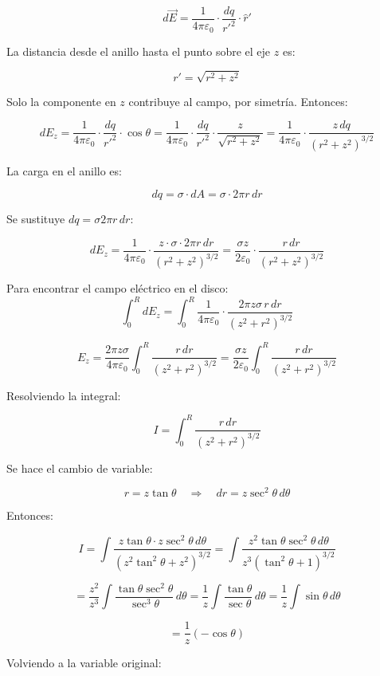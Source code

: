 \documentclass[12pt]{article}
\begin{document}
\[
d\vec{E} = \frac{1}{4\pi \varepsilon_0} \cdot \frac{dq}{r'^2} \cdot \hat{r}'
\]

La distancia desde el anillo hasta el punto sobre el eje \( z \) es:

\[
r' = \sqrt{r^2 + z^2}
\]

Solo la componente en \( z \) contribuye al campo, por simetría. Entonces:

\[
dE_z = \frac{1}{4\pi \varepsilon_0} \cdot \frac{dq}{r'^2} \cdot \cos\theta = \frac{1}{4\pi \varepsilon_0} \cdot \frac{dq}{r'^2} \cdot \frac{z}{\sqrt{r^2 + z^2}} = \frac{1}{4\pi \varepsilon_0} \cdot \frac{z \, dq}{(r^2 + z^2)^{3/2}}
\]

La carga en el anillo es:

\[
dq = \sigma \cdot dA = \sigma \cdot 2\pi r \, dr
\]


Se sustituye \( dq = \sigma 2\pi r \, dr \):

\[
dE_z = \frac{1}{4\pi \varepsilon_0} \cdot \frac{z \cdot \sigma \cdot 2\pi r \, dr}{(r^2 + z^2)^{3/2}} = \frac{\sigma z}{2\varepsilon_0} \cdot \frac{r \, dr}{(r^2 + z^2)^{3/2}}
\]

Para encontrar el campo eléctrico en el disco:
\[
\int_0^R dE_z = \int_0^R \frac{1}{4\pi\varepsilon_0} \cdot \frac{2\pi z \sigma \, r \, dr}{(z^2 + r^2)^{3/2}}
\]

\[
E_z = \frac{2\pi z \sigma}{4\pi \varepsilon_0} \int_0^R \frac{r \, dr}{(z^2 + r^2)^{3/2}} = \frac{\sigma z}{2\varepsilon_0} \int_0^R \frac{r \, dr}{(z^2 + r^2)^{3/2}}
\]

Resolviendo la integral:

\[
I = \int_0^R \frac{r \, dr}{(z^2 + r^2)^{3/2}}
\]

Se hace el cambio de variable:

\[
r = z \tan\theta \quad \Rightarrow \quad dr = z \sec^2 \theta \, d\theta
\]

Entonces:

\[
I = \int \frac{z \tan\theta \cdot z \sec^2 \theta \, d\theta}{\left(z^2 \tan^2\theta + z^2\right)^{3/2}}
= \int \frac{z^2 \tan\theta \sec^2 \theta \, d\theta}{z^3 (\tan^2\theta + 1)^{3/2}}
\]

\[
= \frac{z^2}{z^3} \int \frac{\tan\theta \sec^2\theta}{\sec^3\theta} \, d\theta
= \frac{1}{z} \int \frac{\tan\theta}{\sec\theta} \, d\theta
= \frac{1}{z} \int \sin\theta \, d\theta
\]

\[
= \frac{1}{z} (-\cos\theta)
\]

Volviendo a la variable original:
\end{document}

